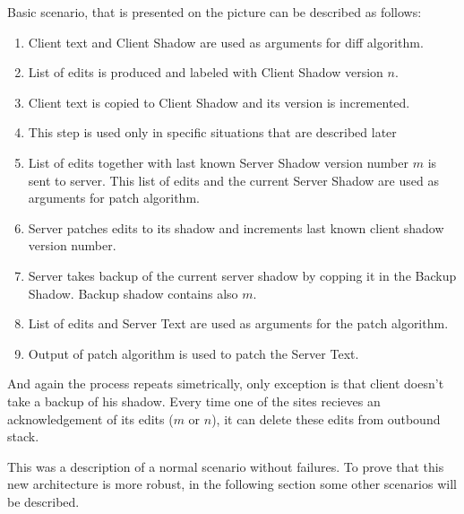 \documentclass[12pt,oneside]{fithesis2}
\begin{document}
\par Basic scenario, that is presented on the picture can be described as follows:
\begin{enumerate}
\item Client text and Client Shadow are used as arguments for diff algorithm.
\item List of edits is produced and labeled with Client Shadow version \(n\).
\item Client text is copied to Client Shadow and its version is incremented.
\item This step is used only in specific situations that are described later
\item List of edits together with last known Server Shadow version number \(m\) is sent to server. This list of edits and the current Server Shadow are used as arguments for patch algorithm. 
\item Server patches edits to its shadow and increments last known client shadow version number.
\item Server takes backup of the current server shadow by copping it in the Backup Shadow. Backup shadow contains also \(m\).
\item List of edits and Server Text are used as arguments for the patch algorithm.
\item Output of patch algorithm is used to patch the Server Text.
\end{enumerate}
\par And again the process repeats simetrically, only exception is that client doesn't take a backup of his shadow. Every time one of the sites recieves an acknowledgement of its edits (\(m\) or \(n\)), it can delete these edits from outbound stack.
\par This was a description of a normal scenario without failures. To prove that this new architecture is more robust, in the following section some other scenarios will be described.
\end{document}
